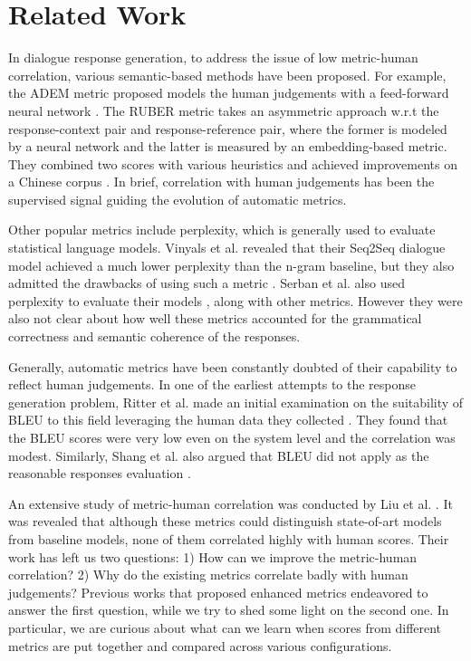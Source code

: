 \documentclass[conference]{IEEEtran}
\begin{document}
\section{Related Work}
In dialogue response generation, to address the issue of low metric-human correlation, various semantic-based methods have been proposed.
For example, the ADEM metric proposed models the human judgements with a feed-forward neural network \cite{ADEM}.
The RUBER metric takes an asymmetric approach w.r.t the response-context pair and response-reference pair, where the former is modeled by a neural network and the latter is measured by an embedding-based metric.
They combined two scores with various heuristics and achieved improvements on a Chinese corpus \cite{RUBER}.
In brief, correlation with human judgements has been the supervised signal guiding the evolution of automatic metrics.

Other popular metrics include perplexity, which is generally used to evaluate statistical language models.
Vinyals et al. revealed that their Seq2Seq dialogue model achieved a much lower perplexity than the n-gram baseline, but they also admitted the drawbacks of using such a metric \cite{GoogleChatbot}.
Serban et al. also used perplexity to evaluate their models \cite{HRED}, along with other metrics.
However they were also not clear about how well these metrics accounted for the grammatical correctness and semantic coherence of the responses.

Generally, automatic metrics have been constantly doubted of their capability to reflect human judgements.
In one of the earliest attempts to the response generation problem, Ritter et al. made an initial examination on the suitability of BLEU to this field leveraging the human data they collected \cite{Ritter11}.
They found that the BLEU scores were very low even on the system level and the correlation was modest.
Similarly, Shang et al. also argued that BLEU did not apply as the reasonable responses evaluation \cite{Shang}.

An extensive study of metric-human correlation was conducted by Liu et al. \cite{HowNot}.
It was revealed that although these metrics could distinguish state-of-art models from baseline models, none of them correlated highly with human scores.
Their work has left us two questions: 1) How can we improve the metric-human correlation? 2) Why do the existing metrics correlate badly with human judgements?
Previous works that proposed enhanced metrics endeavored to answer the first question, while we try to shed some light on the second one.
In particular, we are curious about what can we learn when scores from different metrics are put together and compared across various configurations.
\end{document}
